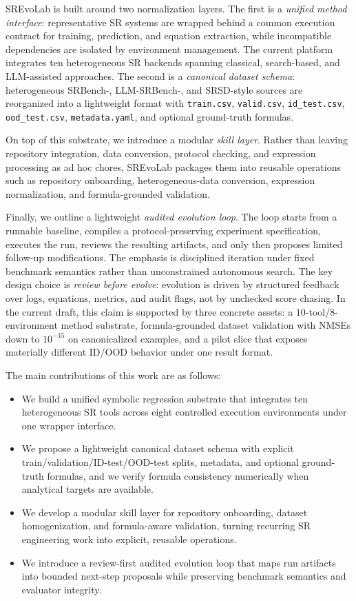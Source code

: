 SREvoLab is built around two normalization layers. The first is a \emph{unified method interface}: representative SR systems are wrapped behind a common execution contract for training, prediction, and equation extraction, while incompatible dependencies are isolated by environment management. The current platform integrates ten heterogeneous SR backends spanning classical, search-based, and LLM-assisted approaches. The second is a \emph{canonical dataset schema}: heterogeneous SRBench-, LLM-SRBench-, and SRSD-style sources are reorganized into a lightweight format with \texttt{train.csv}, \texttt{valid.csv}, \texttt{id\_test.csv}, \texttt{ood\_test.csv}, \texttt{metadata.yaml}, and optional ground-truth formulas.

On top of this substrate, we introduce a modular \emph{skill layer}. Rather than leaving repository integration, data conversion, protocol checking, and expression processing as ad hoc chores, SREvoLab packages them into reusable operations such as repository onboarding, heterogeneous-data conversion, expression normalization, and formula-grounded validation.

Finally, we outline a lightweight \emph{audited evolution loop}. The loop starts from a runnable baseline, compiles a protocol-preserving experiment specification, executes the run, reviews the resulting artifacts, and only then proposes limited follow-up modifications. The emphasis is disciplined iteration under fixed benchmark semantics rather than unconstrained autonomous search. The key design choice is \emph{review before evolve}: evolution is driven by structured feedback over logs, equations, metrics, and audit flags, not by unchecked score chasing. In the current draft, this claim is supported by three concrete assets: a $10$-tool/$8$-environment method substrate, formula-grounded dataset validation with NMSEs down to $10^{-15}$ on canonicalized examples, and a pilot slice that exposes materially different ID/OOD behavior under one result format.

The main contributions of this work are as follows:
\begin{itemize}[leftmargin=1.5em]
    \item We build a unified symbolic regression substrate that integrates ten heterogeneous SR tools across eight controlled execution environments under one wrapper interface.
    \item We propose a lightweight canonical dataset schema with explicit train/validation/ID-test/OOD-test splits, metadata, and optional ground-truth formulas, and we verify formula consistency numerically when analytical targets are available.
    \item We develop a modular skill layer for repository onboarding, dataset homogenization, and formula-aware validation, turning recurring SR engineering work into explicit, reusable operations.
    \item We introduce a review-first audited evolution loop that maps run artifacts into bounded next-step proposals while preserving benchmark semantics and evaluator integrity.
\end{itemize}

